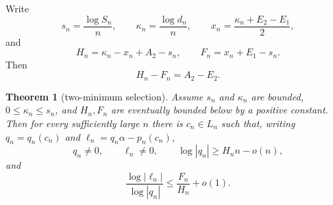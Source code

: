 \documentclass[11pt]{article}
\newtheorem{theorem}{Theorem}[section]
\theoremstyle{definition}
\theoremstyle{remark}
\begin{document}
Write
\[
s_n=\frac{\log S_n}{n},\qquad
\kappa_n=\frac{\log d_n}{n},\qquad
x_n=\frac{\kappa_n+E_2-E_1}{2},
\]
and
\begin{equation}\label{eq:HF}
H_n=\kappa_n-x_n+A_2-s_n,\qquad
F_n=x_n+E_1-s_n.
\end{equation}
Then
\begin{equation}\label{eq:HFdiff}
H_n-F_n=A_2-E_2.
\end{equation}

\begin{theorem}[two-minimum selection]\label{thm:selection}
Assume $s_n$ and $\kappa_n$ are bounded, $0\le\kappa_n\le s_n$, and $H_n,F_n$ are eventually bounded below by a positive constant.  Then for every sufficiently large $n$ there is $c_n\in L_n$ such that, writing
$q_n=q_n(c_n)$ and $\ell_n=q_n\alpha-p_n(c_n)$,
\[
q_n\ne0,\qquad \ell_n\ne0,
\qquad \log|q_n|\ge H_nn-o(n),
\]
and
\begin{equation}\label{eq:ratio-selection}
\frac{\log|\ell_n|}{\log|q_n|}
\le\frac{F_n}{H_n}+o(1).
\end{equation}
\end{theorem}
\end{document}
